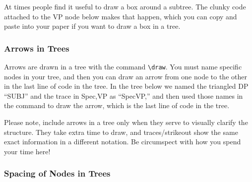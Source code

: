 \documentclass{article}
\begin{document}
At times people find it useful to draw a box around a subtree. The clunky code attached to the VP node below makes that happen, which you can copy and paste into your paper if you want to draw a box in a tree. 



\ea 
{}
\z 

\subsubsection{Arrows in Trees}

Arrows are drawn in a tree with the command \verb|\draw|. You must name specific nodes in your tree, and then you can draw an arrow from one node to the other in the last line of code in the tree. In the tree below we named the triangled DP ``SUBJ'' and the trace in Spec,VP as ``SpecVP,'' and then used those names in the command to draw the arrow, which is the last line of code in the tree. 

\ea \label{ArrowTree}
\z 

\noindent Please note, include arrows in a tree only when they serve to visually clarify the structure. They take extra time to draw, and traces/strikeout show the same exact information in a different notation. Be circumspect with how you spend your time here!


\subsubsection{Spacing of Nodes in Trees} \label{NodeSpacingForest}
\end{document}
